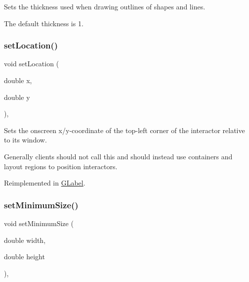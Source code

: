 Sets the thickness used when drawing outlines of shapes and lines. 

The default thickness is 1. \mbox{\label{classGInteractor_a04594e8ba9b98513a64f1da00dcae18c}} 
\subsubsection{\texorpdfstring{set\+Location()}{setLocation()}}
{\footnotesize\ttfamily void set\+Location (\begin{DoxyParamCaption}\item[{double}]{x,  }\item[{double}]{y }\end{DoxyParamCaption})\hspace{0.3cm}{\ttfamily [virtual]}, {\ttfamily [inherited]}}



Sets the onscreen x/y-\/coordinate of the top-\/left corner of the interactor relative to its window. 

Generally clients should not call this and should instead use containers and layout regions to position interactors. 

Reimplemented in \mbox{\hyperlink{classGLabel_ae3b17c0aeb355dc23c4e4cbf066e81f7}{G\+Label}}.

\mbox{\label{classGInteractor_a0cf428e207b7f22cc08138a90b1b87b2}} 
\subsubsection{\texorpdfstring{set\+Minimum\+Size()}{setMinimumSize()}\hspace{0.1cm}{\footnotesize\ttfamily [1/2]}}
{\footnotesize\ttfamily void set\+Minimum\+Size (\begin{DoxyParamCaption}\item[{double}]{width,  }\item[{double}]{height }\end{DoxyParamCaption})\hspace{0.3cm}{\ttfamily [virtual]}, {\ttfamily [inherited]}}



